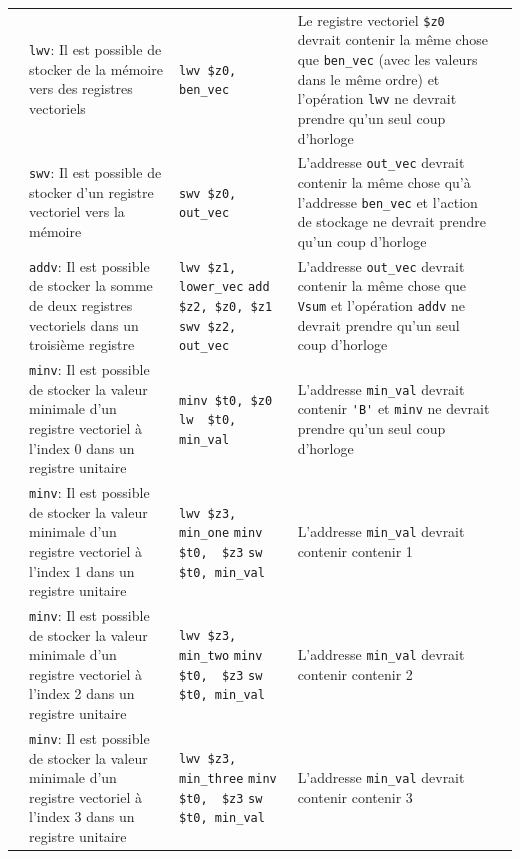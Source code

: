 \documentclass[a11paper]{article}
\newcommand{\cbox}{\fbox{\phantom{\ding{51}}}}
\newcounter{tid}
\newcommand{\tid}{\stepcounter{tid}\thetid}
\begin{document}
\begin{center}
\begin{longtable}{lp{5cm}p{3.5cm}p{4.5cm}l}
		\tid & \verb|lwv|:
		Il est possible de stocker de la mémoire vers des registres vectoriels &
		\verb|lwv $z0, ben_vec|                &
    Le registre vectoriel \verb|$z0| devrait contenir la même chose que
    \verb|ben_vec| (avec les valeurs dans le même ordre)
    et l'opération \verb|lwv| ne devrait prendre qu'un seul coup d'horloge &
		\cbox
		\\

		\tid & \verb|swv|:
		Il est possible de stocker d'un registre vectoriel vers la mémoire &
		\verb|swv $z0, out_vec|                &
    L'addresse \verb|out_vec| devrait contenir la même chose qu'à
    l'addresse \verb|ben_vec| et l'action de stockage ne devrait prendre qu'un
    coup d'horloge &
		\cbox
		\\

		\tid & \verb|addv|:
		Il est possible de stocker la somme de deux registres vectoriels dans un troisième
    registre &
		\verb|lwv $z1, lower_vec|
		\verb|add $z2, $z0, $z1|
		\verb|swv $z2, out_vec|
    &
    L'addresse \verb|out_vec| devrait contenir la même chose que \verb|Vsum|
    et l'opération \verb|addv| ne devrait prendre qu'un seul coup d'horloge &
		\cbox
		\\

		\tid & \verb|minv|:
		Il est possible de stocker la valeur minimale d'un registre vectoriel à l'index 0 dans
    un registre unitaire &
		\verb|minv $t0, $z0|
		\verb|lw  $t0, min_val|
    &
    L'addresse \verb|min_val| devrait contenir \verb|'B'|
    et \verb|minv| ne devrait prendre qu'un seul coup d'horloge &
		\cbox
		\\

		\tid & \verb|minv|:
		Il est possible de stocker la valeur minimale d'un registre vectoriel à l'index 1 dans
    un registre unitaire &
		\verb|lwv $z3, min_one|
		\verb|minv $t0,  $z3|
		\verb|sw  $t0, min_val|
    &
    L'addresse \verb|min_val| devrait contenir  contenir 1
    &
		\cbox
		\\

		\tid & \verb|minv|:
		Il est possible de stocker la valeur minimale d'un registre vectoriel à l'index 2 dans
    un registre unitaire &
		\verb|lwv $z3, min_two|
		\verb|minv $t0,  $z3|
		\verb|sw  $t0, min_val|
    &
    L'addresse \verb|min_val| devrait contenir  contenir 2
    &
		\cbox
		\\

		\tid & \verb|minv|:
		Il est possible de stocker la valeur minimale d'un registre vectoriel à l'index 3 dans
    un registre unitaire &
		\verb|lwv $z3, min_three|
		\verb|minv $t0,  $z3|
		\verb|sw  $t0, min_val|
    &
    L'addresse \verb|min_val| devrait contenir  contenir 3
    &
		\cbox
		\\

	\end{longtable}
\end{center}
\end{document}
